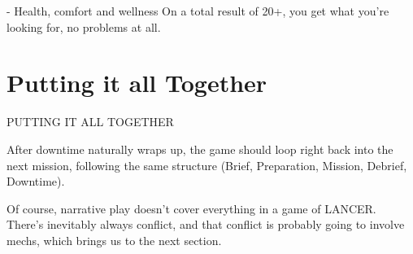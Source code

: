      -   Health, comfort and wellness
On a total result of 20+, you get what you’re looking for, no problems at all.

\section{Putting it all Together}
                                    PUTTING IT ALL TOGETHER

After downtime naturally wraps up, the game should loop right back into the next mission,
following the same structure (Brief, Preparation, Mission, Debrief, Downtime).

Of course, narrative play doesn’t cover everything in a game of LANCER. There’s inevitably
always conflict, and that conflict is probably going to involve mechs, which brings us to the next
section.

